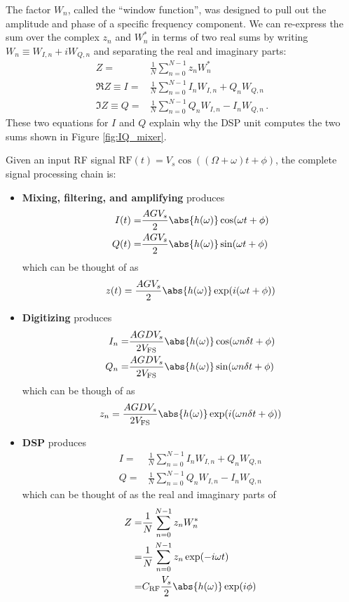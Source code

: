 The factor $W_n$, called the ``window function'', was designed to pull out the amplitude and phase of a specific frequency component.
We can re-express the sum over the complex $z_n$ and $W_n^*$ in terms of two real sums by writing $W_n \equiv W_{I,n} + i W_{Q,n}$ and separating the real and imaginary parts:
\begin{align*}
  Z =& \frac{1}{N} \sum_{n=0}^{N-1} z_n W_n^* \\
  \Re Z \equiv I =& \frac{1}{N} \sum_{n=0}^{N-1} I_n W_{I,n} + Q_n W_{Q,n} \\
  \Im Z \equiv Q =& \frac{1}{N} \sum_{n=0}^{N-1} Q_n W_{I,n} - I_n W_{Q,n} \, .
\end{align*}
These two equations for $I$ and $Q$ explain why the DSP unit computes the two sums shown in Figure \ref{fig:IQ_mixer}.


Given an input RF signal $\text{RF}(t) = V_s \cos((\Omega + \omega) t + \phi)$, the complete signal processing chain is:
\begin{itemize}

  \item \textbf{Mixing, filtering, and amplifying} produces
    \begin{align*}
      I(t) =& \frac{A G V_s}{2} \abs{h(\omega)} \cos(\omega t + \phi) \\
      Q(t) =& \frac{A G V_s}{2} \abs{h(\omega)} \sin(\omega t + \phi)
    \end{align*}
    which can be thought of as
    \begin{equation*}
      z(t) = \frac{A G V_s}{2} \abs{h(\omega)} \exp(i (\omega t + \phi))
    \end{equation*}

  \item \textbf{Digitizing} produces
    \begin{align*}
      I_n =& \frac{A G D V_s}{2 V_\text{FS}} \abs{h(\omega)} \cos(\omega n \delta t + \phi) \\
      Q_n =& \frac{A G D V_s}{2 V_\text{FS}} \abs{h(\omega)} \sin(\omega n \delta t + \phi)
    \end{align*}
    which can be though of as
    \begin{equation*}
      z_n = \frac{A G D V_s}{2 V_\text{FS}} \abs{h(\omega)} \exp(i(\omega n \delta t + \phi))
    \end{equation*}

  \item \textbf{DSP} produces
    \begin{align*}
      I =& \frac{1}{N} \sum_{n=0}^{N-1} I_n W_{I,n} + Q_n W_{Q,n} \\
      Q =& \frac{1}{N} \sum_{n=0}^{N-1} Q_n W_{I,n} - I_n W_{Q,n}
    \end{align*}
    which can be thought of as the real and imaginary parts of
    \begin{align*}
      Z
      =& \frac{1}{N} \sum_{n=0}^{N-1} z_n W_n^* \\
      =& \frac{1}{N} \sum_{n=0}^{N-1} z_n \exp (-i \omega t) \\
      =& C_\text{RF} \frac{V_s}{2} \abs{h(\omega)} \exp(i \phi)
    \end{align*}
\end{itemize}

